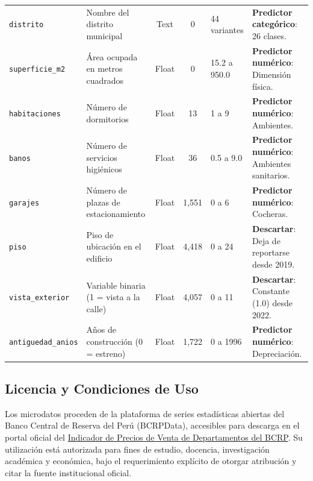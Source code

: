 \documentclass[11pt,a4paper]{article}
\begin{document}
\begin{table}[H]
\begin{tabularx}{\textwidth}{lp{3.5cm}cclX}
\texttt{distrito} & Nombre del distrito municipal & Text & 0 & 44 variantes & \textbf{Predictor categórico}: 26 clases. \\
\texttt{superficie\_m2} & Área ocupada en metros cuadrados & Float & 0 & 15.2 a 950.0 & \textbf{Predictor numérico}: Dimensión física. \\
\texttt{habitaciones} & Número de dormitorios & Float & 13 & 1 a 9 & \textbf{Predictor numérico}: Ambientes. \\
\texttt{banos} & Número de servicios higiénicos & Float & 36 & 0.5 a 9.0 & \textbf{Predictor numérico}: Ambientes sanitarios. \\
\texttt{garajes} & Número de plazas de estacionamiento & Float & 1,551 & 0 a 6 & \textbf{Predictor numérico}: Cocheras. \\
\texttt{piso} & Piso de ubicación en el edificio & Float & 4,418 & 0 a 24 & \textbf{Descartar}: Deja de reportarse desde 2019. \\
\texttt{vista\_exterior} & Variable binaria (1 = vista a la calle) & Float & 4,057 & 0 a 11 & \textbf{Descartar}: Constante (1.0) desde 2022. \\
\texttt{antiguedad\_anios} & Años de construcción (0 = estreno) & Float & 1,722 & 0 a 1996 & \textbf{Predictor numérico}: Depreciación. \\
\bottomrule
\end{tabularx}
\end{table}

\subsection{Licencia y Condiciones de Uso}
Los microdatos proceden de la plataforma de series estadísticas abiertas del Banco Central de Reserva del Perú (BCRPData), accesibles para descarga en el portal oficial del \href{https://www.bcrp.gob.pe/estadisticas/indicador-de-precios-de-venta-de-departamentos.html}{Indicador de Precios de Venta de Departamentos del BCRP}. Su utilización está autorizada para fines de estudio, docencia, investigación académica y económica, bajo el requerimiento explícito de otorgar atribución y citar la fuente institucional oficial.
\end{document}
